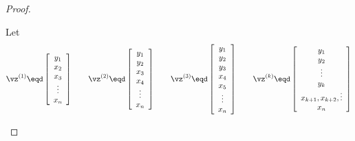 {\begin{proof}
\begin{enumerate}
Let
\[
  \vz^{(1)} \eqd
  \left[\begin{array}{c}
    y_1 \\ x_2 \\ x_3 \\ \vdots \\  x_n
  \end{array}\right]
  \quad\quad
  \vz^{(2)}\eqd
  \left[\begin{array}{c}
    y_1 \\ y_2 \\ x_3 \\ x_4 \\ \vdots \\  x_n
  \end{array}\right]
  \quad\quad
  \vz^{(3)}\eqd
  \left[\begin{array}{c}
    y_1 \\ y_2 \\ y_3 \\ x_4 \\ x_5 \\ \vdots \\  x_n
  \end{array}\right]
  \quad\quad
  \vz^{(k)}\eqd
  \left[\begin{array}{c}
    y_1 \\ y_2 \\ \vdots \\ y_k \\ x_{k+1}, x_{k+2}, \vdots \\ x_n
  \end{array}\right]
\]


\end{enumerate}
\end{proof}}
